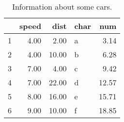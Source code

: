 \documentclass[a4paper,twoside,11pt]{article}
\begin{document}
\begin{table}[ht]
\centering
\begin{tabular}{rrrlr}
  \hline
 & speed & dist & char & num \\ 
  \hline
1 & 4.00 & 2.00 & a & 3.14 \\ 
  2 & 4.00 & 10.00 & b & 6.28 \\ 
  3 & 7.00 & 4.00 & c & 9.42 \\ 
  4 & 7.00 & 22.00 & d & 12.57 \\ 
  5 & 8.00 & 16.00 & e & 15.71 \\ 
  6 & 9.00 & 10.00 & f & 18.85 \\ 
   \hline
\end{tabular}
\caption{Information about some cars.} 
\end{table}
\end{document}
